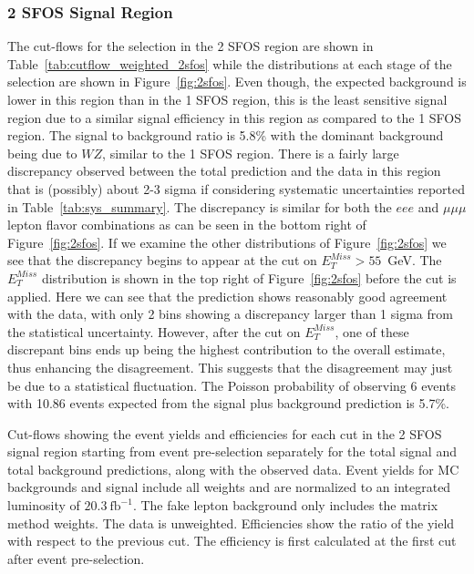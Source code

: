 %

\clearpage
\subsubsection{2 SFOS Signal Region}
The cut-flows for the selection in the 2 SFOS region are shown in Table~\ref{tab:cutflow_weighted_2sfos}
while the distributions at each stage of the selection are shown in Figure~\ref{fig:2sfos}.
Even though, the expected background is lower in this region than in the 1 SFOS region, this is the least sensitive signal region 
due to a similar signal efficiency in this region as compared to the 1 SFOS region.
The signal to background ratio is 5.8\% with the dominant background being due to $WZ$, similar to the 1 SFOS region.
There is a fairly large discrepancy observed between the total prediction and the data in this region that is (possibly)
about 2-3 sigma if considering systematic uncertainties reported in Table~\ref{tab:sys_summary}.
The discrepancy is similar for both the $eee$ and $\mu\mu\mu$ lepton flavor combinations as can be seen in the bottom
right of Figure~\ref{fig:2sfos}. If we examine the other distributions of Figure~\ref{fig:2sfos} we see that
the discrepancy begins to appear at the cut on $E_{T}^{Miss} > 55$~GeV. The $E_{T}^{Miss}$ distribution is shown in the
top right of Figure~\ref{fig:2sfos} before the cut is applied. Here we can see that the prediction shows reasonably good
agreement with the data, with only 2 bins showing a discrepancy larger than 1 sigma from the statistical uncertainty. However,
after the cut on $E_{T}^{Miss}$, one of these discrepant bins ends up being the highest contribution to the overall estimate, thus
enhancing the disagreement. This suggests that the disagreement may just be due to a statistical fluctuation.
The Poisson probability of observing 6 events with 10.86 events expected from the signal plus background prediction is 5.7\%.

\begin{table}[ht!]
\small
\centering

\caption{Cut-flows showing the event yields and efficiencies for each cut in the 2 SFOS signal region
starting from event pre-selection separately for the total signal and total background predictions, along with the observed data.
Event yields for MC backgrounds and signal include all weights and are normalized to an integrated luminosity of $20.3~\mathrm{fb}^{-1}$.  
The fake lepton background only includes the matrix method weights.  The data is unweighted.
Efficiencies show the ratio of the yield with respect
to the previous cut.  The efficiency is first calculated at the first cut after event pre-selection.  }
\label{tab:cutflow_weighted_2sfos}
\end{table}

